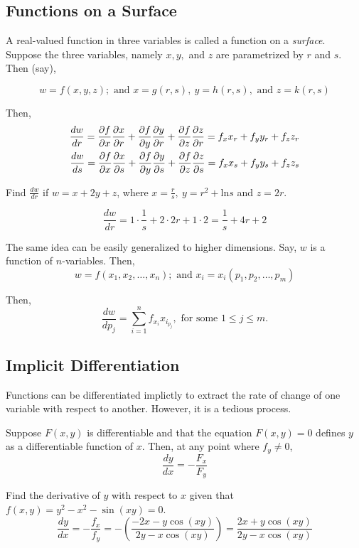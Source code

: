\subsection{Functions on a Surface}
A real-valued function in three variables is called a function on a \textit{surface}. Suppose the three variables, namely
$x, y, $ and $z$ are parametrized by $r$ and $s$. Then (say),

$$w = f(x, y, z);\text{ and } x = g(r, s),\ y = h(r, s), \text{ and } z = k(r, s)$$

Then,
\begin{align}
    \frac{dw}{dr} = \frac{\partial f}{\partial x} \frac{\partial x}{\partial r} + \frac{\partial f}{\partial y} \frac{\partial y}{\partial r} +
    \frac{\partial f}{\partial z} \frac{\partial z}{\partial r} = f_x x_r + f_y y_r + f_z z_r \\
    \frac{dw}{ds} = \frac{\partial f}{\partial x} \frac{\partial x}{\partial s} + \frac{\partial f}{\partial y} \frac{\partial y}{\partial s} +
    \frac{\partial f}{\partial z} \frac{\partial z}{\partial s} = f_x x_s + f_y y_s + f_z z_s
\end{align}

\begin{example}
    \normalfont Find $\frac{dw}{dr}$ if $w = x + 2y + z$, where $x = \frac{r}{s},\ y = r^2 + \text{ln}s$ and $z = 2r$.

    $$\frac{dw}{dr} = 1 \cdot \frac{1}{s} + 2 \cdot 2r + 1 \cdot 2 = \frac{1}{s} + 4r + 2$$
\end{example}

The same idea can be easily generalized to higher dimensions. Say, $w$ is a function of $n$-variables. Then,
$$w = f(x_1, x_2, \hdots, x_n); \text{ and } x_i = x_i(p_1, p_2, \hdots, p_m)$$

Then,
\begin{equation}
    \frac{dw}{dp_j} = \sum_{i = 1}^n f_{x_i} x_{i_{p_j}}, \text{ for some } 1 \leq j \leq m.
\end{equation}


\subsection{Implicit Differentiation}
Functions can be differentiated implictly to extract the rate of change of one variable with respect to another. However,
it is a tedious process.

\begin{theorem}
    Suppose $F(x, y)$ is differentiable and that the equation $F(x, y) = 0$ defines $y$ as a differentiable function of $x$.
    Then, at any point where $f_y \neq 0$,
    \begin{equation}
        \frac{dy}{dx} = -\frac{F_x}{F_y}
    \end{equation}
\end{theorem}

\begin{example}
    \normalfont Find the derivative of $y$ with respect to $x$ given that $f(x, y) = y^2 - x^2 - \sin{(xy)} = 0$.
    $$\frac{dy}{dx} = -\frac{f_x}{f_y} = - \left( \frac{-2x - y\cos{(xy)}}{2y - x\cos{(xy)}} \right)
    = \frac{2x + y\cos{(xy)}}{2y - x\cos{(xy)}}$$
\end{example}